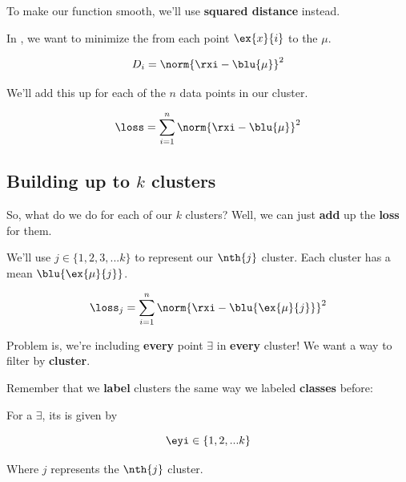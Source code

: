         To make our function smooth, we'll use \textbf{squared distance} instead.\\
        
        \begin{concept}
            In , we want to minimize the  from each point $\ex{x}{i}$ to the  $\mu$.
        \end{concept}
        
        \begin{equation}
            D_i = \norm{ \rxi - \blu{\mu} }^2
        \end{equation}
        
        We'll add this up for each of the $n$ data points in our cluster.
        
        \begin{equation}
            \loss = \sum_{i=1}^n \norm{ \rxi - \blu{\mu} }^2
        \end{equation}
        
    \subsection{Building up to $k$ clusters}
    
        So, what do we do for each of our $k$ clusters? Well, we can just \textbf{add} up the \textbf{loss} for them.
        
        We'll use $j \in \{1, 2, 3, ... k\}$ to represent our $\nth{j}$ cluster. Each cluster has a mean $\blu{\ex{\mu}{j}}$.
        
        \newcommand{\bmuj}[0]{ \blu{\ex{\mu}{j}} } %
        
        \begin{equation}
            \loss_j = \sum_{i=1}^n \norm{ \rxi - \bmuj }^2
        \end{equation}
        
        Problem is, we're including \textbf{every} point $\exi$ in \textbf{every} cluster! We want a way to filter by \textbf{cluster}.
        
        Remember that we \textbf{label} clusters the same way we labeled \textbf{classes} before:\\
        
        \begin{notation}
            For a  $\exi$, its  is given by
            
            \begin{equation*}
                \eyi \in \{1, 2, ... k \}
            \end{equation*}
            
            Where $j$ represents the $\nth{j}$ cluster.
        \end{notation}
        
